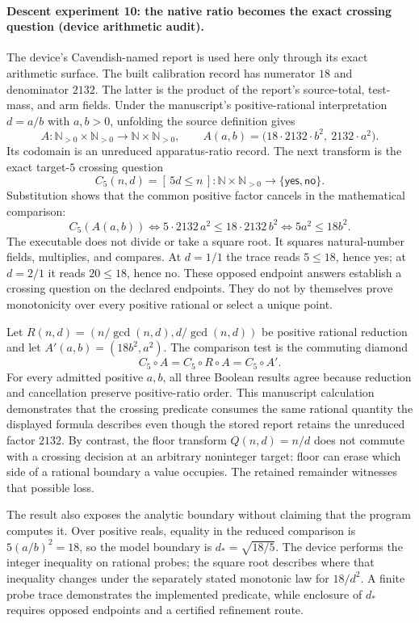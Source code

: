 \paragraph{Descent experiment 10: the native ratio becomes the exact crossing question (device arithmetic audit).}
The device's Cavendish-named report is used here only through its exact arithmetic surface.  The built calibration
record has numerator \(18\) and denominator \(2132\).  The latter is the product of the report's source-total,
test-mass, and arm fields.  Under the manuscript's positive-rational interpretation \(d=a/b\) with \(a,b>0\),
unfolding the source definition gives
\[
 A:\mathbb N_{>0}\times\mathbb N_{>0}\longrightarrow
 \mathbb N\times\mathbb N_{>0},\qquad
 A(a,b)=\bigl(18\cdot2132\cdot b^2,\ 2132\cdot a^2\bigr).
\]
Its codomain is an unreduced apparatus-ratio record.  The next transform is the exact target-\(5\) crossing question
\[
 C_5(n,d)=[\,5d\leq n\,]:
 \mathbb N\times\mathbb N_{>0}\longrightarrow\{\mathsf{yes},\mathsf{no}\}.
\]
Substitution shows that the common positive factor cancels in the mathematical comparison:
\[
 C_5(A(a,b))\Longleftrightarrow
 5\cdot2132\,a^2\leq18\cdot2132\,b^2
 \Longleftrightarrow 5a^2\leq18b^2.
\]
The executable does not divide or take a square root.  It squares natural-number fields, multiplies, and compares.
At \(d=1/1\) the trace reads \(5\leq18\), hence yes; at \(d=2/1\) it reads \(20\leq18\), hence no.  These opposed
endpoint answers establish a crossing question on the declared endpoints.  They do not by themselves prove
monotonicity over every positive rational or select a unique point.

Let \(R(n,d)=(n/\gcd(n,d),d/\gcd(n,d))\) be positive rational reduction and let
\(A'(a,b)=(18b^2,a^2)\).  The comparison test is the commuting diamond
\[
                         C_5\circ A=C_5\circ R\circ A
                         =C_5\circ A'.
\]
For every admitted positive \(a,b\), all three Boolean results agree because reduction and cancellation preserve
positive-ratio order.  This manuscript calculation demonstrates that the crossing predicate consumes the same
rational quantity the
displayed formula describes even though the stored report retains the unreduced factor \(2132\).  By contrast, the
floor transform \(Q(n,d)=n/d\) does not commute with a crossing decision at an arbitrary noninteger target: floor can
erase which side of a rational boundary a value occupies.  The retained remainder witnesses that possible loss.

The result also exposes the analytic boundary without claiming that the program computes it.  Over positive reals,
equality in the reduced comparison is \(5(a/b)^2=18\), so the model boundary is
\(d_*=\sqrt{18/5}\).  The device performs the integer inequality on rational probes; the square root describes where
that inequality changes under the separately stated monotonic law for \(18/d^2\).  A finite probe trace demonstrates
the implemented predicate, while enclosure of \(d_*\) requires opposed endpoints and a certified refinement route.

